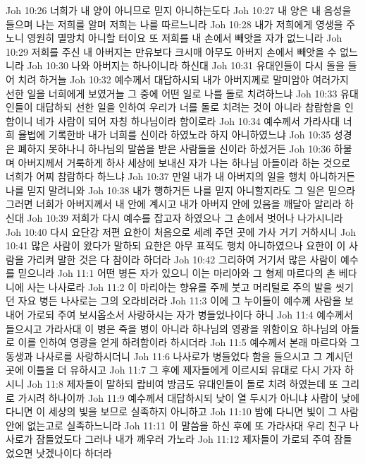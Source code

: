 Joh 10:26  너희가 내 양이 아니므로 믿지 아니하는도다
Joh 10:27  내 양은 내 음성을 들으며 나는 저희를 알며 저희는 나를 따르느니라
Joh 10:28  내가 저희에게 영생을 주노니 영원히 멸망치 아니할 터이요 또 저희를 내 손에서 빼앗을 자가 없느니라
Joh 10:29  저희를 주신 내 아버지는 만유보다 크시매 아무도 아버지 손에서 빼앗을 수 없느니라
Joh 10:30  나와 아버지는 하나이니라 하신대
Joh 10:31  유대인들이 다시 돌을 들어 치려 하거늘
Joh 10:32  예수께서 대답하시되 내가 아버지께로 말미암아 여러가지 선한 일을 너희에게 보였거늘 그 중에 어떤 일로 나를 돌로 치려하느냐
Joh 10:33  유대인들이 대답하되 선한 일을 인하여 우리가 너를 돌로 치려는 것이 아니라 참람함을 인함이니 네가 사람이 되어 자칭 하나님이라 함이로라
Joh 10:34  예수께서 가라사대 너희 율법에 기록한바 내가 너희를 신이라 하였노라 하지 아니하였느냐
Joh 10:35  성경은 폐하지 못하나니 하나님의 말씀을 받은 사람들을 신이라 하셨거든
Joh 10:36  하물며 아버지께서 거룩하게 하사 세상에 보내신 자가 나는 하나님 아들이라 하는 것으로 너희가 어찌 참람하다 하느냐
Joh 10:37  만일 내가 내 아버지의 일을 행치 아니하거든 나를 믿지 말려니와
Joh 10:38  내가 행하거든 나를 믿지 아니할지라도 그 일은 믿으라 그러면 너희가 아버지께서 내 안에 계시고 내가 아버지 안에 있음을 깨달아 알리라 하신대
Joh 10:39  저희가 다시 예수를 잡고자 하였으나 그 손에서 벗어나 나가시니라
Joh 10:40  다시 요단강 저편 요한이 처음으로 세례 주던 곳에 가사 거기 거하시니
Joh 10:41  많은 사람이 왔다가 말하되 요한은 아무 표적도 행치 아니하였으나 요한이 이 사람을 가리켜 말한 것은 다 참이라 하더라
Joh 10:42  그리하여 거기서 많은 사람이 예수를 믿으니라
Joh 11:1  어떤 병든 자가 있으니 이는 마리아와 그 형제 마르다의 촌 베다니에 사는 나사로라
Joh 11:2  이 마리아는 향유를 주께 붓고 머리털로 주의 발을 씻기던 자요 병든 나사로는 그의 오라비러라
Joh 11:3  이에 그 누이들이 예수께 사람을 보내어 가로되 주여 보시옵소서 사랑하시는 자가 병들었나이다 하니
Joh 11:4  예수께서 들으시고 가라사대 이 병은 죽을 병이 아니라 하나님의 영광을 위함이요 하나님의 아들로 이를 인하여 영광을 얻게 하려함이라 하시더라
Joh 11:5  예수께서 본래 마르다와 그 동생과 나사로를 사랑하시더니
Joh 11:6  나사로가 병들었다 함을 들으시고 그 계시던 곳에 이틀을 더 유하시고
Joh 11:7  그 후에 제자들에게 이르시되 유대로 다시 가자 하시니
Joh 11:8  제자들이 말하되 랍비여 방금도 유대인들이 돌로 치려 하였는데 또 그리로 가시려 하나이까
Joh 11:9  예수께서 대답하시되 낮이 열 두시가 아니냐 사람이 낮에 다니면 이 세상의 빛을 보므로 실족하지 아니하고
Joh 11:10  밤에 다니면 빛이 그 사람 안에 없는고로 실족하느니라
Joh 11:11  이 말씀을 하신 후에 또 가라사대 우리 친구 나사로가 잠들었도다 그러나 내가 깨우러 가노라
Joh 11:12  제자들이 가로되 주여 잠들었으면 낫겠나이다 하더라
